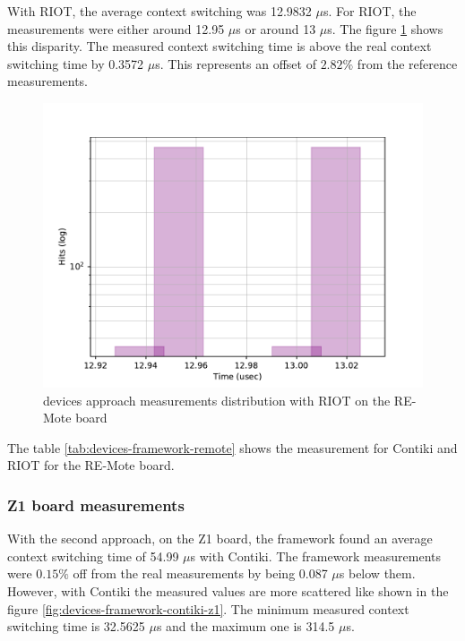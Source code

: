 With RIOT, the average context switching was 12.9832 $\mu$s.
For RIOT, the measurements were either around 12.95 $\mu$s or around 13 $\mu$s.
The figure \ref{fig:devices-framework-riot-remote} shows this disparity.
The measured context switching time is above the real context switching time by 0.3572 $\mu$s.
This represents an offset of $2.82\%$ from the reference measurements.

\begin{figure}[!ht]
      \centering
      \includegraphics[scale=.7]{assets/devices-framework-riot-remote.pdf}
      \caption{devices approach measurements distribution with RIOT on the RE-Mote board\label{fig:devices-framework-riot-remote}}
\end{figure}

The table \ref{tab:devices-framework-remote} shows the measurement for Contiki and RIOT for the RE-Mote board.



\subsubsection{Z1 board measurements}
With the second approach, on the Z1 board, the framework found an average context switching time of 54.99 $\mu$s with Contiki.
The framework measurements were $0.15\%$ off from the real measurements by being 0.087 $\mu$s below them.
However, with Contiki the measured values are more scattered like shown in the figure \ref{fig:devices-framework-contiki-z1}.
The minimum measured context switching time is 32.5625 $\mu$s and the maximum one is 314.5 $\mu$s.

